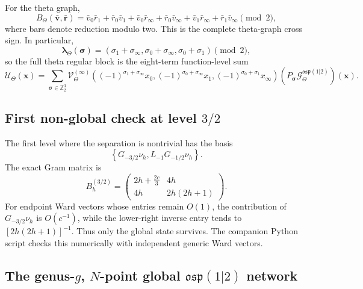 \documentclass[11pt]{article}
\newcommand{\osp}{\mathfrak{osp}(1|2)}
\newcommand{\G}{\mathcal G}
\newcommand{\V}{\mathcal V}
\newcommand{\U}{\mathcal U}
\begin{document}
For the theta graph,
\begin{equation}
 B_\Theta(\bar{\bm v},\bar{\bm r})
 =\bar v_0\bar r_1+\bar r_0\bar v_1
  +\bar v_0\bar r_\infty+\bar r_0\bar v_\infty
  +\bar v_1\bar r_\infty+\bar r_1\bar v_\infty
  \pmod2,
 \label{eq:theta-polarized-sign}
\end{equation}
where bars denote reduction modulo two.  This is the complete theta-graph
cross sign.  In particular,
\begin{equation}
 \bm\lambda_\Theta(\bm\sigma)
 =(\sigma_1+\sigma_\infty,
   \sigma_0+\sigma_\infty,
   \sigma_0+\sigma_1)\pmod2,
 \label{eq:theta-sign-flip-vector}
\end{equation}
so the full theta regular block is the eight-term function-level sum
\begin{equation}
 \U_\Theta(\bm x)
 =\sum_{\bm\sigma\in\mathbb Z_2^3}
 \V_\Theta^{(\infty)}
 \left((-1)^{\sigma_1+\sigma_\infty}x_0,
       (-1)^{\sigma_0+\sigma_\infty}x_1,
       (-1)^{\sigma_0+\sigma_1}x_\infty\right)
 (P_{\bm\sigma}\G_\Theta^{\osp})(\bm x).
 \label{eq:theta-regular-parity-resummed}
\end{equation}

\subsection{\texorpdfstring{First non-global check at level \(3/2\)}
{First non-global check at level 3/2}}

The first level where the separation is nontrivial has the basis
\begin{equation}
 \left\{
  G_{-3/2}\nu_h,
  L_{-1}G_{-1/2}\nu_h
 \right\}.
 \label{eq:level-three-half-basis}
\end{equation}
The exact Gram matrix is
\begin{equation}
 B_h^{(3/2)}=
 \begin{pmatrix}
  2h+\frac{2c}{3}&4h\\
  4h&2h(2h+1)
 \end{pmatrix}.
 \label{eq:level-three-half-gram}
\end{equation}
For endpoint Ward vectors whose entries remain \(O(1)\), the contribution
of \(G_{-3/2}\nu_h\) is \(O(c^{-1})\), while the lower-right inverse entry
tends to \([2h(2h+1)]^{-1}\).  Thus only the global state survives.  The
companion Python script checks this numerically with independent generic Ward
vectors.

\subsection{\texorpdfstring{The genus-\(g\), \(N\)-point global \(\osp\) network}
{The genus-g, N-point global osp(1|2) network}}
\label{sec:global-network}
\end{document}
